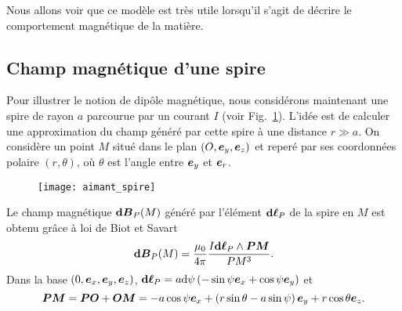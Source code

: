 	Nous allons voir que ce modèle est très utile lorsqu'il s'agit de décrire
	le comportement magnétique de la matière. 
	
	\subsection{Champ magnétique d'une spire}
	Pour illustrer le notion de dipôle magnétique,
	nous considérons maintenant une spire de rayon $a$ parcourue par un courant $I$
	(voir Fig.~\ref{fig:aimant_spire}).
	L'idée est de calculer une approximation du champ généré par cette spire
	à une distance $r \gg a$. On considère un point $M$ situé dans le plan 
	$(O, \ey, \ez)$ et reperé par ses coordonnées polaire $(r, \theta)$, 
	où $\theta$ est l'angle entre $\ey$ et $\er$.

	\begin{figure}[htpb]
		\centering
		\texttt{[image: aimant\_spire]}
		\caption{}%
		\label{fig:aimant_spire}
	\end{figure}

	Le champ magnétique $\mathrm{\textbf{d}}\vecb_P(M)$ généré par l'élément $\dl_P$ 
	de la spire en $M$ est obtenu grâce à loi de Biot et Savart
	\begin{equation*}
		\mathrm{\textbf{d}}\vecb_P(M) = \dfrac{\mu_0}{4 \pi} 
			\dfrac{I \dl_P \wedge \mitbf{PM}}{PM^3}.
	\end{equation*}
	Dans la base $(0, \ex, \ey, \ez)$, $\dl_P = a \mathrm{d}\psi \left(
	- \sin \psi \ex + \cos \psi \ey \right)$ et
	\begin{equation*}
		\mitbf{PM} = \mitbf{PO} + \mitbf{OM}  
		= -a \cos \psi \ex + \left(r\sin \theta - a \sin \psi\right)\ey +
		     r \cos \theta \ez.
	\end{equation*}
	
